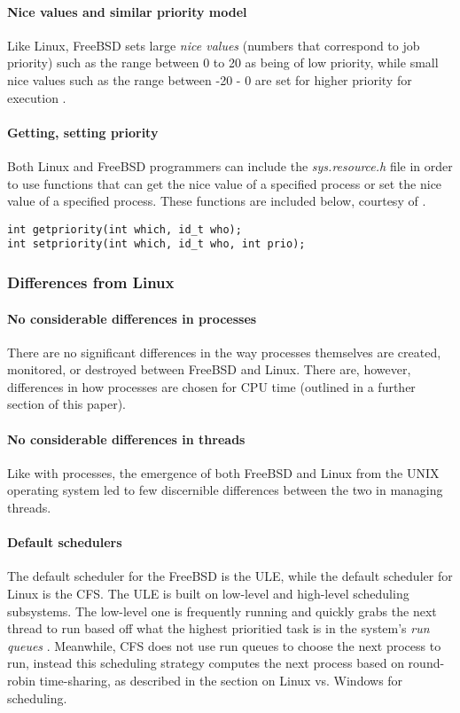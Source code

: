 \documentclass[letterpaper,10pt,titlepage]{article}
\begin{document}
\paragraph{Nice values and similar priority model} Like Linux, FreeBSD sets large \emph{nice values} (numbers that correspond to job priority) such as the range between 0 to 20 as being of low priority, while small nice values such as the range between -20 - 0 are set for higher priority for execution \cite{freeBSD2}. 
\paragraph{Getting, setting priority} Both Linux and FreeBSD programmers can include the \emph{sys.resource.h} file in order to use functions that can get the nice value of a specified process or set the nice value of a specified process. These functions are included below, courtesy of \cite{linux2}. 
\begin{lstlisting}
int getpriority(int which, id_t who);
int setpriority(int which, id_t who, int prio);
\end{lstlisting}

\subsubsection{Differences from Linux}
\paragraph{No considerable differences in processes} There are no significant differences in the way processes themselves are created, monitored, or destroyed between FreeBSD and Linux. There are, however, differences in how processes are chosen for CPU time (outlined in a further section of this paper).
\paragraph{No considerable differences in threads} Like with processes, the emergence of both FreeBSD and Linux from the UNIX operating system led to few discernible differences between the two in managing threads. 
\paragraph{Default schedulers}The default scheduler for the FreeBSD is the ULE, while the default scheduler for Linux is the CFS. The ULE is built on low-level and high-level scheduling subsystems. The low-level one is frequently running and quickly grabs the next thread to run based off what the highest prioritied task is in the system's \emph{run queues} \cite{freeBSD1}. Meanwhile, CFS does not use run queues to choose the next process to run, instead this scheduling strategy computes the next process based on round-robin time-sharing, as described in the section on Linux vs. Windows for scheduling.
\end{document}
